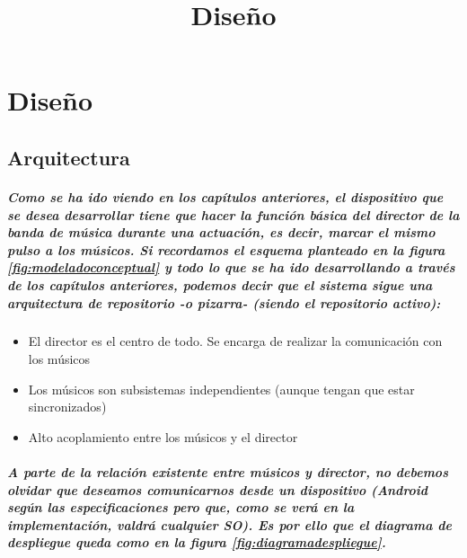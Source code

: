 \chapter{Diseño}
\title{Diseño}
\label{cap:Diseno}

\section{Arquitectura}
\paragraph{
Como se ha ido viendo en los capítulos anteriores, el dispositivo que se desea desarrollar
tiene que hacer la función básica del director de la banda de música durante una actuación,
es decir, marcar el mismo pulso a los músicos.
Si recordamos el esquema planteado en la figura \ref{fig:modeladoconceptual} y todo lo
que se ha ido desarrollando a través de los capítulos anteriores, podemos decir
que el sistema sigue una arquitectura de repositorio -o pizarra- (siendo el repositorio activo):
}
\begin{itemize}
  \item El director es el centro de todo. Se encarga de realizar la comunicación con los músicos
  \item Los músicos son subsistemas independientes (aunque tengan que estar sincronizados)
  \item Alto acoplamiento entre los músicos y el director
\end{itemize}

\paragraph{
A parte de la relación existente entre músicos y director, no debemos olvidar que
deseamos comunicarnos desde un dispositivo (Android según las especificaciones pero que,
como se verá en la implementación, valdrá cualquier SO). Es por ello que el diagrama
de despliegue queda como en la figura \ref{fig:diagramadespliegue}.
}

